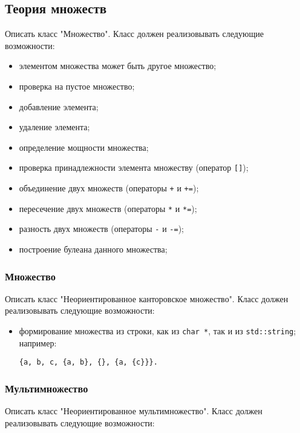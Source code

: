 \documentclass[a4paper,12pt]{article}
\begin{document}
\subsection{Теория множеств}

Описать класс "Множество".
Класс должен реализовывать следующие возможности:

\begin{itemize}
\item элементом множества может быть другое множество;
\item проверка на пустое множество;
\item добавление элемента;
\item удаление элемента;
\item определение мощности множества;
\item проверка принадлежности элемента множеству (оператор
  \lstinline|[]|);
\item объединение двух множеств (операторы \lstinline|+| и
  \lstinline|+=|);
\item пересечение двух множеств (операторы \lstinline|*| и
  \lstinline|*=|);
\item разность двух множеств (операторы \lstinline|-| и
  \lstinline|-=|);
\item построение булеана данного множества;
\end{itemize}

\subsubsection{Множество}

Описать класс "Неориентированное канторовское множество".  Класс
должен реализовывать следующие возможности:

\begin{itemize}
\item формирование множества из строки, как из \lstinline|char *|, так
  и из \lstinline|std::string|; например:
\begin{verbatim}
{a, b, c, {a, b}, {}, {a, {c}}}.
\end{verbatim}
\end{itemize}

\subsubsection{Мультимножество}

Описать класс "Неориентированное мультимножество". Класс должен
реализовывать следующие возможности:
\end{document}
